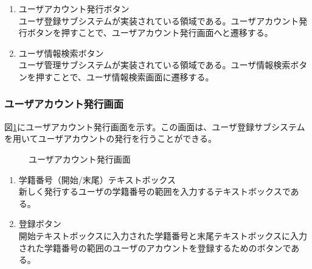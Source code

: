 \documentclass[a4j]{jarticle}
\begin{document}
\begin{enumerate}
  \renewcommand{\labelenumi}{\textcircled{\scriptsize \theenumi}}

\item ユーザアカウント発行ボタン\\
ユーザ登録サブシステムが実装されている領域である。ユーザアカウント発行ボタンを押すことで、ユーザアカウント発行画面へと遷移する。

\item ユーザ情報検索ボタン\\
ユーザ管理サブシステムが実装されている領域である。ユーザ情報検索ボタンを押すことで、ユーザ情報検索画面に遷移する。

\end{enumerate}

\subsubsection{ユーザアカウント発行画面}
図\ref{fig:create_user}にユーザアカウント発行画面を示す。この画面は、ユーザ登録サブシステムを用いてユーザアカウントの発行を行うことができる。
\begin{figure}[H]
\centering
{}
\caption{ユーザアカウント発行画面}
\label{fig:create_user}
\end{figure}

\begin{enumerate}
  \renewcommand{\labelenumi}{\textcircled{\scriptsize \theenumi}}

\item 学籍番号（開始/末尾）テキストボックス\\
  新しく発行するユーザの学籍番号の範囲を入力するテキストボックスである。
\item 登録ボタン\\
  開始テキストボックスに入力された学籍番号と末尾テキストボックスに入力された学籍番号の範囲のユーザのアカウントを登録するためのボタンである。
\end{enumerate}
\end{document}
